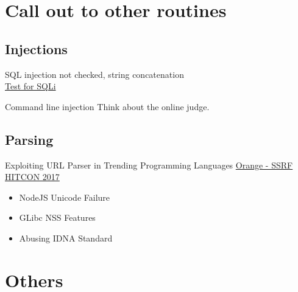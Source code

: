 \documentclass{beamer}
\begin{document}
\begin{CJK*}{UTF8}{bsmi}
    \section{Call out to other routines}
    \subsection{Injections}
    \begin{frame}{SQL injection}
        not checked, string concatenation\\
        \href{http://demo.orange.tw/sqli/}{Test for SQLi}
        
    \end{frame}

    \begin{frame}{Command line injection}
        Think about the online judge.\\
        
    \end{frame}

    \subsection{Parsing}
    \begin{frame}{Exploiting URL Parser in Trending Programming Languages}
        \href{https://hitcon.org/2017/CMT/slide-files/d2_r0_keynote.pdf}{Orange - SSRF HITCON 2017}
        \begin{itemize}
            \item NodeJS Unicode Failure
            \item GLibc NSS Features
            \item Abusing IDNA Standard
        \end{itemize}
    \end{frame}

    \section{Others}

\end{CJK*}
\end{document}
